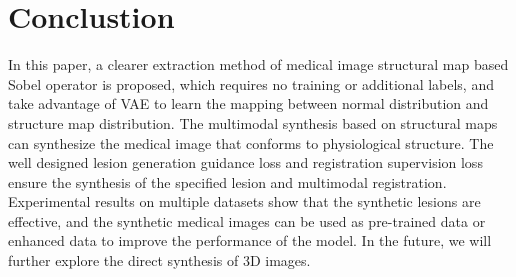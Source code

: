 \documentclass[runningheads]{llncs}
\begin{document}
	\section{Conclustion}
	In this paper, a clearer extraction method of medical image structural map based Sobel operator is proposed, which requires no training or additional labels, and take advantage of VAE to learn the mapping between normal distribution and structure map distribution. The multimodal synthesis based on structural maps can synthesize the medical image that conforms to physiological structure. The well designed lesion generation guidance loss and registration supervision loss ensure the synthesis of the specified lesion and multimodal registration. Experimental results on multiple datasets show that the synthetic lesions are effective, and the synthetic medical images can be used as pre-trained data or enhanced data to improve the performance of the model. In the future, we will further explore the direct synthesis of 3D images.
	
	
		
\end{document}
